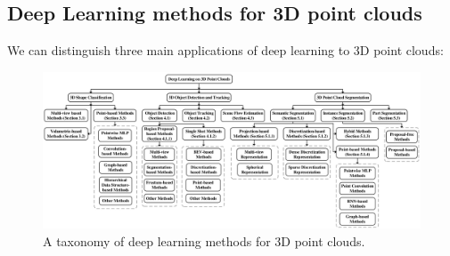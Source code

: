 \documentclass[11pt,a4paper]{article}
\begin{document}
\subsection{Deep Learning methods for 3D point clouds}
We can distinguish three main applications of deep learning to 3D point clouds:
\begin{figure}[H]
    \centering
    \includegraphics[scale=0.8]{imgs/pointcloud-deeplearning-taxonomy.jpg}
    \caption{A taxonomy of deep learning methods for 3D point clouds.\cite{abs200106280}}
\end{figure}
\noindent
\end{document}
